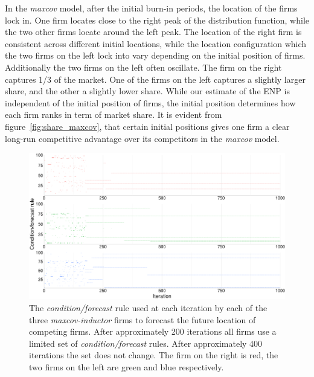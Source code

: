 \documentclass[preprint, 12pt]{elsarticle}
\begin{document}
In the \emph{maxcov} model, after the initial burn-in periods, the location of the firms lock in. One firm locates close to the right peak of the distribution function, while the two other firms locate around the left peak. The location of the right firm is consistent across different initial locations, while the location configuration which the two firms on the left lock into vary depending on the initial position of firms. Additionally the two firms on the left often oscillate. The firm on the right captures 1/3 of the market. One of the firms on the left captures a slightly larger share, and the other a slightly lower share. While our estimate of the ENP is independent of the initial position of firms, the initial position determines how each firm ranks in term of market share. It is evident from figure~\ref{fig:share_maxcov}, that certain initial positions gives one firm a clear long-run competitive advantage over its competitors in the \emph{maxcov} model. 

\begin{figure}[ht!]
	\centering
	\includegraphics[width=1\textwidth]{Graphics/fig5cf_mi.pdf}
	\caption{The \emph{condition/forecast} rule used at each iteration by each of the three \emph{maxcov-inductor} firms to forecast the future location of competing firms. After approximately 200 iterations all firms use a limited set of \emph{condition/forecast} rules. After approximately 400 iterations the set does not change. The firm on the right is red, the two firms on the left are green and blue respectively.}
	\label{fig:cf}
\end{figure}
\end{document}
